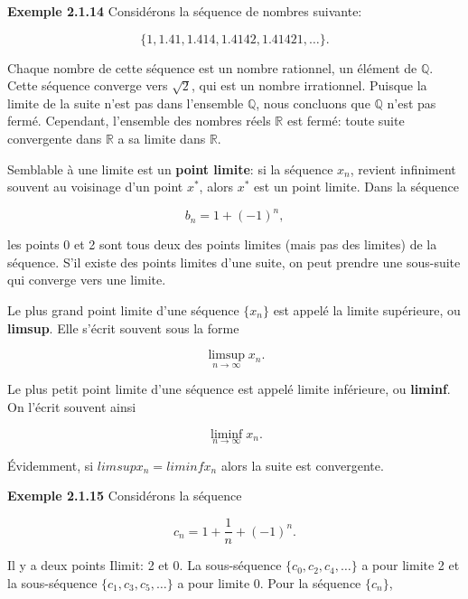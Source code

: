 \documentclass[11pt,twoside,a4paper]{article}
\begin{document}
\textbf{Exemple 2.1.14} Considérons la séquence de nombres suivante:

\begin{equation*}
  \{1, 1.41, 1.414, 1.4142, 1.41421, \ldots\}.
\end{equation*}

Chaque nombre de cette séquence est un nombre rationnel, un élément de $\mathbb{Q}$. Cette séquence converge vers $\sqrt{2}$, qui est un nombre irrationnel.
Puisque la limite de la suite n'est pas dans l'ensemble $\mathbb{Q}$, nous concluons que $\mathbb{Q}$ n'est pas fermé. Cependant, l'ensemble des nombres réels $\mathbb{R}$ est fermé: toute suite convergente dans $\mathbb{R}$ a sa limite dans $\mathbb{R}$.

Semblable à une limite est un \textbf{point limite}: si la séquence $x_n$, revient infiniment souvent au voisinage d'un point $x^*$, alors $x^*$ est un point limite. Dans la séquence

\begin{equation*}
  b_n = 1 + (-1)^n,
\end{equation*}

les points 0 et 2 sont tous deux des points limites (mais pas des limites) de la séquence. S'il existe des points limites d'une suite, on peut prendre une sous-suite qui converge vers une limite.

Le plus grand point limite d'une séquence $\{x_n\}$ est appelé la limite supérieure, ou \textbf{limsup}. Elle s'écrit souvent sous la forme

\begin{equation*}
  \limsup_{n \longrightarrow \infty} x_n.
\end{equation*}

Le plus petit point limite d'une séquence est appelé limite inférieure, ou \textbf{liminf}. On l'écrit souvent ainsi

\begin{equation*}
  \liminf_{n \longrightarrow \infty} x_n.
\end{equation*}

Évidemment, si $lim sup x_n = lim inf x_n$ alors la suite est convergente.

\textbf{Exemple 2.1.15} Considérons la séquence

\begin{equation*}
  c_n = 1+ \frac{1}{n} + (-1)^n.
\end{equation*}

Il y a deux points Ilimit: 2 et 0. La sous-séquence $\{c_0, c_2, c_4, \ldots\}$ a pour limite 2 et la sous-séquence $\{c_1, c_3, c_5, \ldots\}$ a pour limite 0. Pour la séquence $\{c_n\}$,
\end{document}
